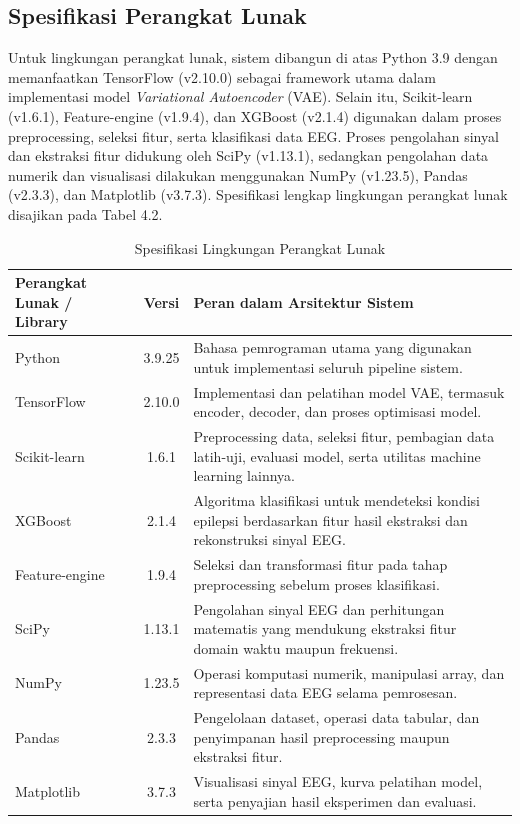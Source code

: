 \subsection{Spesifikasi Perangkat Lunak}
Untuk lingkungan perangkat lunak, sistem dibangun di atas Python 3.9 dengan memanfaatkan TensorFlow (v2.10.0) sebagai framework utama dalam implementasi model \textit{Variational Autoencoder} (VAE). Selain itu, Scikit-learn (v1.6.1), Feature-engine (v1.9.4), dan XGBoost (v2.1.4) digunakan dalam proses preprocessing, seleksi fitur, serta klasifikasi data EEG. Proses pengolahan sinyal dan ekstraksi fitur didukung oleh SciPy (v1.13.1), sedangkan pengolahan data numerik dan visualisasi dilakukan menggunakan NumPy (v1.23.5), Pandas (v2.3.3), dan Matplotlib (v3.7.3). Spesifikasi lengkap lingkungan perangkat lunak disajikan pada Tabel 4.2.\begin{table}[H]
\centering
\caption{Spesifikasi Lingkungan Perangkat Lunak}
\label{tab:software-spec}
\footnotesize
\begin{tabular}{|p{4.5cm}|c|p{7.5cm}|}
\hline
\textbf{Perangkat Lunak / Library} & \textbf{Versi} & \textbf{Peran dalam Arsitektur Sistem} \\
\hline
Python & 3.9.25 & Bahasa pemrograman utama yang digunakan untuk implementasi seluruh pipeline sistem. \\
\hline
TensorFlow & 2.10.0 & Implementasi dan pelatihan model VAE, termasuk encoder, decoder, dan proses optimisasi model. \\
\hline
Scikit-learn & 1.6.1 & Preprocessing data, seleksi fitur, pembagian data latih-uji, evaluasi model, serta utilitas machine learning lainnya. \\
\hline
XGBoost & 2.1.4 & Algoritma klasifikasi untuk mendeteksi kondisi epilepsi berdasarkan fitur hasil ekstraksi dan rekonstruksi sinyal EEG. \\
\hline
Feature-engine & 1.9.4 & Seleksi dan transformasi fitur pada tahap preprocessing sebelum proses klasifikasi. \\
\hline
SciPy & 1.13.1 & Pengolahan sinyal EEG dan perhitungan matematis yang mendukung ekstraksi fitur domain waktu maupun frekuensi. \\
\hline
NumPy & 1.23.5 & Operasi komputasi numerik, manipulasi array, dan representasi data EEG selama pemrosesan. \\
\hline
Pandas & 2.3.3 & Pengelolaan dataset, operasi data tabular, dan penyimpanan hasil preprocessing maupun ekstraksi fitur. \\
\hline
Matplotlib & 3.7.3 & Visualisasi sinyal EEG, kurva pelatihan model, serta penyajian hasil eksperimen dan evaluasi. \\
\hline
\end{tabular}
\end{table}

